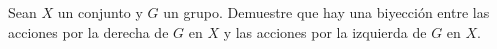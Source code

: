 \begin{ejercicio}
   Sean $X$ un conjunto y $G$ un grupo. Demuestre que hay una biyección entre las acciones por la derecha de $G$ en $X$ y las acciones por la izquierda de $G$ en $X$.
\end{ejercicio}

\begin{demostracion}

\end{demostracion}
